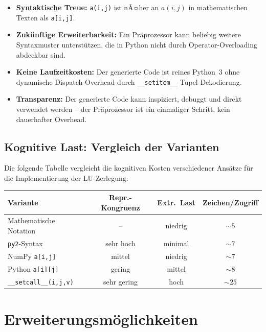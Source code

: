 ﻿\documentclass[a4paper,12pt]{article}
\theoremstyle{definition}
\begin{document}
\begin{itemize}
	\item \textbf{Syntaktische Treue:} \texttt{a(i,j)} ist nÃ¤her an $a(i,j)$ in
	      mathematischen Texten als \texttt{a[i,j]}.
	\item \textbf{Zuk\"unftige Erweiterbarkeit:} Ein Pr\"aprozessor kann beliebig
	      weitere Syntaxmuster unterst\"utzen, die in Python nicht durch
	      Operator-Overloading abdeckbar sind.
	\item \textbf{Keine Laufzeitkosten:} Der generierte Code ist reines Python~3
	      ohne dynamische Dispatch-Overhead durch \texttt{\_\_setitem\_\_}-Tupel-Dekodierung.
	\item \textbf{Transparenz:} Der generierte Code kann inspiziert, debuggt und
	      direkt verwendet werden -- der Pr\"aprozessor ist ein einmaliger Schritt,
	      kein dauerhafter Overhead.
\end{itemize}

\subsection{Kognitive Last: Vergleich der Varianten}

Die folgende Tabelle vergleicht die kognitiven Kosten verschiedener Ans\"atze f\"ur
die Implementierung der LU-Zerlegung:

\begin{center}
\begin{tabular}{lccc}
\toprule
\textbf{Variante} & \textbf{Repr.-Kongruenz} & \textbf{Extr.\ Last} & \textbf{Zeichen/Zugriff} \\
\midrule
Mathematische Notation & -- & niedrig & $\sim 5$ \\
\texttt{py2}-Syntax & sehr hoch & minimal & $\sim 7$ \\
NumPy \texttt{a[i,j]} & mittel & niedrig & $\sim 7$ \\
Python \texttt{a[i][j]} & gering & mittel & $\sim 8$ \\
\texttt{\_\_setcall\_\_(i,j,v)} & sehr gering & hoch & $\sim 25$ \\
\bottomrule
\end{tabular}
\end{center}

\section{Erweiterungsm\"oglichkeiten}
\end{document}
